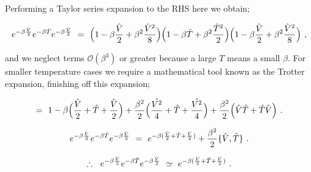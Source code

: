 \documentclass[11pt]{article}
\begin{document}
Performing a Taylor series expansion to the RHS here we obtain;

\begin{equation} \label{wr-eq-6-1}
e^{-\beta \frac{\hat{V}}{2}} e^{-\beta \hat{T}} e^{-\beta \frac{\hat{V}}{2}} \hspace{0.125cm} = \hspace{0.125cm} \Big( 1 - \beta \frac{\hat{V}}{2} + \beta^2 \frac{\hat{V}^2}{8} \Big) \Big( 1 - \beta \hat{T} + \beta^2 \frac{\hat{T}^2}{2} \Big) \Big( 1 - \beta \frac{\hat{V}}{2} + \beta^2 \frac{\hat{V}^2}{8} \Big) \hspace{0.125cm} ,
\end{equation}

and we neglect terms \begin{math} \mathcal{O}(\beta^3) \end{math} or greater because a large \begin{math} T \end{math} means a small \begin{math} \beta \end{math}. For smaller temperature cases we require a mathematical tool known as the Trotter expansion, finishing off this expansion;

\begin{equation} \label{wr-eq-7-1}
= \hspace{0.125cm} 1 - \beta \Big( \frac{\hat{V}}{2} + \hat{T} + \frac{\hat{V}}{2} \Big) + \frac{\beta^2}{2} \Big( \frac{\hat{V^2}}{4} + \hat{T} + \frac{\hat{V^2}}{4} \Big) +  \frac{\beta^2}{2} \Big( \hat{V} \hat{T} + \hat{T} \hat{V} \Big) \hspace{0.125cm} .
\end{equation}

\begin{equation} \label{wr-eq-8-1}
e^{-\beta \frac{\hat{V}}{2}} e^{-\beta \hat{T}} e^{-\beta \frac{\hat{V}}{2}} \hspace{0.125cm} = \hspace{0.125cm} e^{-\beta ( \frac{\hat{V}}{2} + \hat{T} + \frac{\hat{V}}{2} )} + \frac{\beta^2}{2} \{ \hat{V} , \hat{T} \}  \hspace{0.125cm} .
\end{equation}

\begin{equation} \label{wr-eq-9-1}
\therefore  \hspace{0.225cm}  e^{-\beta \frac{\hat{V}}{2}} e^{-\beta \hat{T}} e^{-\beta \frac{\hat{V}}{2}} \hspace{0.125cm} \simeq \hspace{0.125cm} e^{-\beta ( \frac{\hat{V}}{2} + \hat{T} + \frac{\hat{V}}{2} )} \hspace{0.125cm} .
\end{equation}
\end{document}
